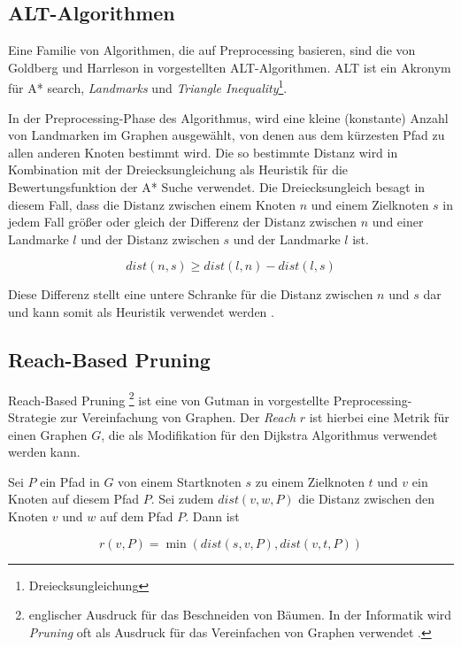 \subsection{ALT-Algorithmen}
\label{ALT-Algorithmen}
Eine Familie von Algorithmen, die auf Preprocessing basieren, sind die von Goldberg und Harrleson in \cite{Goldberg2005} vorgestellten ALT-Algorithmen. ALT ist ein Akronym für A* search, \textit{Landmarks} und \textit{Triangle Inequality}\footnote{Dreiecksungleichung}. 

In der Preprocessing-Phase des Algorithmus, wird eine kleine (konstante) Anzahl von Landmarken im Graphen ausgewählt, von denen aus dem kürzesten Pfad zu allen anderen Knoten bestimmt wird. Die so bestimmte Distanz wird in Kombination mit der Dreiecksungleichung als Heuristik für die Bewertungsfunktion der A* Suche verwendet. 
\newpage
Die Dreiecksungleich besagt in diesem Fall, dass die Distanz zwischen einem Knoten $n$ und einem Zielknoten $s$ in jedem Fall größer oder gleich der Differenz  der Distanz zwischen $n$ und einer Landmarke $l$ und der Distanz zwischen $s$ und der Landmarke $l$ ist.

\begin{equation} \label{eq:3.2}
	dist(n,s) \ge dist(l,n)-dist(l,s)
\end{equation}


Diese Differenz stellt eine untere Schranke für die Distanz zwischen $n$ und $s$ dar und kann somit als Heuristik verwendet werden \cite{Goldberg2005}.

\subsection{Reach-Based Pruning}
\label{Reach-Based Pruning}
Reach-Based Pruning \footnote{englischer Ausdruck für das Beschneiden von Bäumen. In der Informatik wird \textit{Pruning} oft als Ausdruck für das Vereinfachen von Graphen verwendet \cite{Wikipedia:00}.} ist eine von Gutman in \cite{Gutman2004} vorgestellte Preprocessing-Strategie zur Vereinfachung von Graphen. Der \textit{Reach} $r$ ist hierbei eine Metrik für einen Graphen $G$, die als Modifikation für den Dijkstra Algorithmus verwendet werden kann. 

Sei $P$ ein Pfad in $G$ von einem Startknoten $s$ zu einem Zielknoten $t$ und $v$ ein Knoten auf diesem Pfad $P$. Sei zudem $dist(v,w,P)$ die Distanz zwischen den Knoten $v$ und $w$ auf dem Pfad $P$. Dann ist

\begin{equation} \label{eq:3.3}
	r(v,P) = \min{(dist(s,v,P), dist(v,t,P))}
\end{equation}

